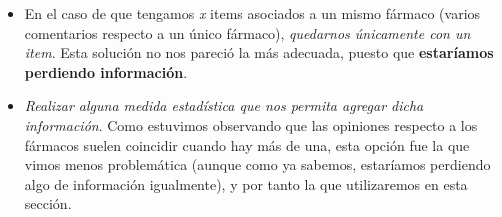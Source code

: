 \documentclass[spanish,]{article}
\begin{document}
\begin{itemize}
\item
  En el caso de que tengamos \emph{x} items asociados a un mismo fármaco
  (varios comentarios respecto a un único fármaco), \emph{quedarnos
  únicamente con un item}. Esta solución no nos pareció la más adecuada,
  puesto que \textbf{estaríamos perdiendo información}.
\item
  \emph{Realizar alguna medida estadística que nos permita agregar dicha
  información}. Como estuvimos observando que las opiniones respecto a
  los fármacos suelen coincidir cuando hay más de una, esta opción fue
  la que vimos menos problemática (aunque como ya sabemos, estaríamos
  perdiendo algo de información igualmente), y por tanto la que
  utilizaremos en esta sección.
\end{itemize}
\end{document}
